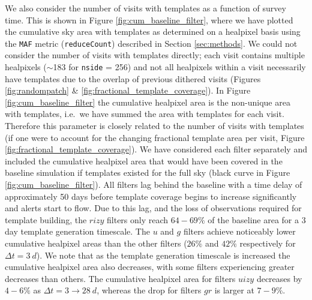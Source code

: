 \documentclass[preprintm,linenumbers]{aastex631}
\newcommand{\maf}{\texttt{MAF}\xspace}
\begin{document}
  We also consider the number of visits with templates as a function of survey time.
		This is shown in Figure \ref{fig:cum_baseline_filter}, where we have plotted the cumulative sky area with templates as determined on a healpixel basis using the \maf metric (\verb|reduceCount|) described in Section \ref{sec:methods}.
		We could not consider the number of visits with templates directly; each visit contains multiple healpixels ($\sim$183 for \texttt{nside} = 256) and not all healpixels within a visit necessarily have templates due to the overlap of previous dithered visits (Figures \ref{fig:randompatch} \& \ref{fig:fractional_template_coverage}). %
		In Figure \ref{fig:cum_baseline_filter} the cumulative healpixel area is the non-unique area with templates, i.e.\ we have summed the area with templates for each visit. 		
		Therefore this parameter is closely related to the number of visits with templates (if one were to account for the changing fractional template area per visit, Figure \ref{fig:fractional_template_coverage}).
		We have considered each filter separately and included the cumulative healpixel area that would have been covered in the baseline simulation if templates existed for the full sky (black curve in Figure \ref{fig:cum_baseline_filter}).
		All filters lag behind the baseline with a time delay of approximately 50 days before template coverage begins to increase significantly and alerts start to flow.
  Due to this lag, and the loss of observations required for template building, the $rizy$ filters only reach $64-69\%$ of the baseline area for a 3 day template generation timescale.
		The $u$ and $g$ filters achieve noticeably lower cumulative healpixel areas than the other filters ($26\%$ and $42\%$ respectively for $\Delta t = 3\ \si{d}$).
		We note that as the template generation timescale is increased the cumulative healpixel area also decreases, with some filters experiencing greater decreases than others.
		The cumulative healpixel area for filters $uizy$ decreases by $4-6\%$ as $\Delta t = 3 \rightarrow 28\ \si{d}$, whereas the drop for filters $gr$ is larger at $7 - 9 \%$. %
\end{document}
